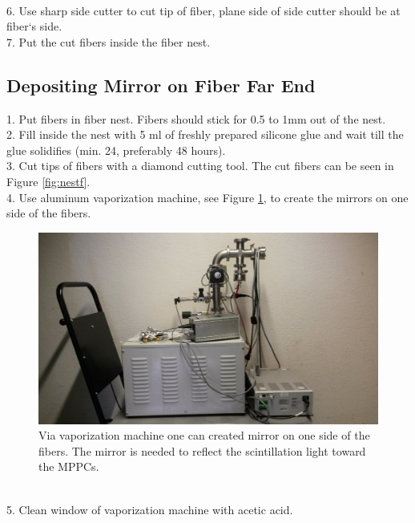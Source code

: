\documentclass[a4paper]{article}\linespread{1.4}
\begin{document}
\\6.	Use sharp side cutter to cut tip of fiber, plane side of side cutter should be at fiber`s side.
\\7.	Put the cut fibers inside the fiber nest.

\subsection{Depositing Mirror on Fiber Far End}
1.	Put fibers in fiber nest. Fibers should stick for 0.5 to 1mm out of the nest.
\\2.	Fill inside the nest with 5 ml of freshly prepared silicone glue and wait till the glue solidifies (min. 24, preferably 48 hours).
\\3.	Cut tips of fibers with a diamond cutting tool. The cut fibers can be seen in Figure \ref{fig:nestf}.
\\4.	Use aluminum vaporization machine, see Figure \ref{fig:vap}, to create the mirrors on one side of the fibers.
\begin{figure}[h!] \hspace*{-0.5cm} \includegraphics[width=135mm,scale=2.0]{figures/vappaint.jpg} \caption{Via vaporization machine one can created mirror on one side of the fibers. The mirror is needed to reflect the scintillation light toward the MPPCs.} \label{fig:vap}\end{figure}
\\5.	Clean window of vaporization machine with acetic acid.
\end{document}
